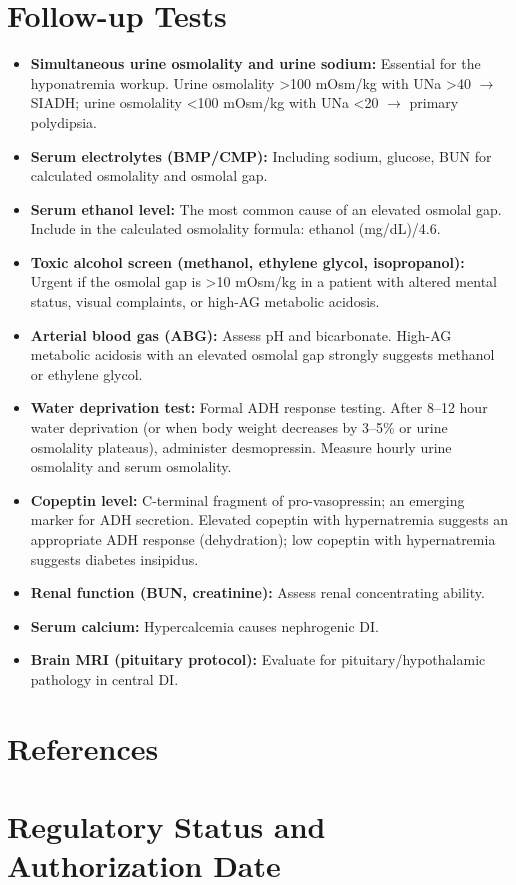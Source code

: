 \section*{Follow-up Tests}
\begin{itemize}
  \item \textbf{Simultaneous urine osmolality and urine sodium:} Essential for the hyponatremia workup. Urine osmolality >100 mOsm/kg with UNa >40 $\rightarrow$ SIADH; urine osmolality <100 mOsm/kg with UNa <20 $\rightarrow$ primary polydipsia.
  \item \textbf{Serum electrolytes (BMP/CMP):} Including sodium, glucose, BUN for calculated osmolality and osmolal gap.
  \item \textbf{Serum ethanol level:} The most common cause of an elevated osmolal gap. Include in the calculated osmolality formula: ethanol (mg/dL)/4.6.
  \item \textbf{Toxic alcohol screen (methanol, ethylene glycol, isopropanol):} Urgent if the osmolal gap is >10 mOsm/kg in a patient with altered mental status, visual complaints, or high-AG metabolic acidosis.
  \item \textbf{Arterial blood gas (ABG):} Assess pH and bicarbonate. High-AG metabolic acidosis with an elevated osmolal gap strongly suggests methanol or ethylene glycol.
  \item \textbf{Water deprivation test:} Formal ADH response testing. After 8--12 hour water deprivation (or when body weight decreases by 3--5\% or urine osmolality plateaus), administer desmopressin. Measure hourly urine osmolality and serum osmolality.
  \item \textbf{Copeptin level:} C-terminal fragment of pro-vasopressin; an emerging marker for ADH secretion. Elevated copeptin with hypernatremia suggests an appropriate ADH response (dehydration); low copeptin with hypernatremia suggests diabetes insipidus.
  \item \textbf{Renal function (BUN, creatinine):} Assess renal concentrating ability.
  \item \textbf{Serum calcium:} Hypercalcemia causes nephrogenic DI.
  \item \textbf{Brain MRI (pituitary protocol):} Evaluate for pituitary/hypothalamic pathology in central DI.
\end{itemize}

\section*{References}



\clearpage
\section*{Regulatory Status and Authorization Date}

\clearpage
